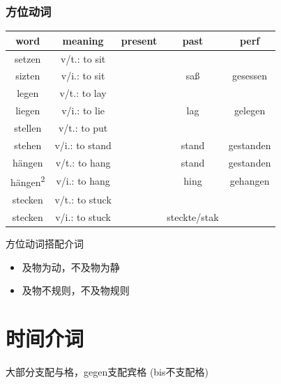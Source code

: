 \subsubsection{方位动词}
\begin{center}
    \begin{tabular} {|c|c|c|c|c|}
        \hline
        \rowcolor{gray}
        word                      & meaning        & present & past         & perf      \\
        \hline
        setzen                    & v/t.: to sit   &         &              &           \\
        sizten                    & v/i.: to sit   &         & saß          & gesessen  \\
        \hline
        legen                     & v/t.: to lay   &         &              &           \\
        liegen                    & v/i.: to lie   &         & lag          & gelegen   \\
        \hline
        stellen                   & v/t.: to put   &         &              &           \\
        stehen                    & v/i.: to stand &         & stand        & gestanden \\
        \hline
        hängen                    & v/t.: to hang  &         & stand        & gestanden \\
        hängen\textsuperscript{2} & v/i.: to hang  &         & hing         & gehangen  \\
        \hline
        stecken                   & v/t.: to stuck &         &              &           \\
        stecken                   & v/i.: to stuck &         & steckte/stak &           \\
        \hline
    \end{tabular}
\end{center}

方位动词搭配介词
\begin{itemize}
    \item 及物为动，不及物为静
    \item 及物不规则，不及物规则
\end{itemize}


\restoregeometry

\section{时间介词}
大部分支配与格，gegen支配宾格 (bis不支配格)

